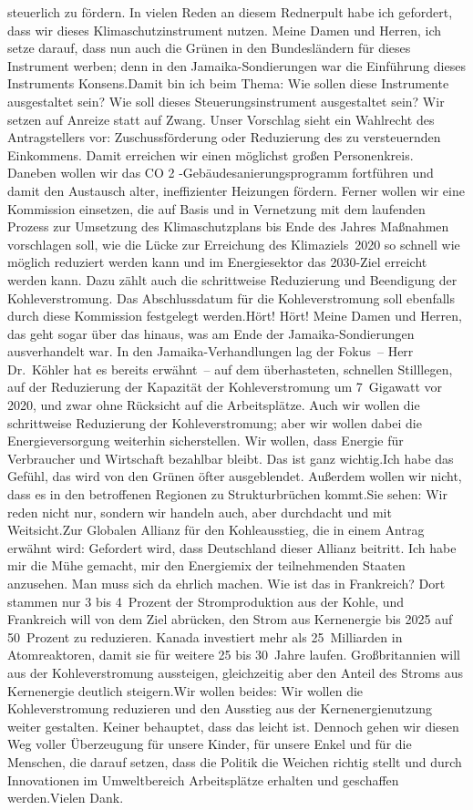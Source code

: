 \documentclass{article}
\begin{document}
steuerlich zu fördern. In vielen Reden an diesem Rednerpult habe ich gefordert, dass wir dieses Klimaschutzinstrument nutzen. Meine Damen und Herren, ich setze darauf, dass nun auch die Grünen in den Bundesländern für dieses Instrument werben; denn in den Jamaika-Sondierungen war die Einführung dieses Instruments Konsens.Damit bin ich beim Thema: Wie sollen diese Instrumente ausgestaltet sein? Wie soll dieses Steuerungsinstrument ausgestaltet sein? Wir setzen auf Anreize statt auf Zwang. Unser Vorschlag sieht ein Wahlrecht des Antragstellers vor: Zuschussförderung oder Reduzierung des zu versteuernden Einkommens. Damit erreichen wir einen möglichst großen Personenkreis. Daneben wollen wir das CO 2 -Gebäudesanierungsprogramm fortführen und damit den Austausch alter, ineffizienter Heizungen fördern. Ferner wollen wir eine Kommission einsetzen, die auf Basis und in Vernetzung mit dem laufenden Prozess zur Umsetzung des Klimaschutzplans bis Ende des Jahres Maßnahmen vorschlagen soll, wie die Lücke zur Erreichung des Klimaziels 2020 so schnell wie möglich reduziert werden kann und im Energiesektor das 2030-Ziel erreicht werden kann. Dazu zählt auch die schrittweise Reduzierung und Beendigung der Kohleverstromung. Das Abschlussdatum für die Kohleverstromung soll ebenfalls durch diese Kommission festgelegt werden.Hört! Hört! Meine Damen und Herren, das geht sogar über das hinaus, was am Ende der Jamaika-Sondierungen ausverhandelt war. In den Jamaika-Verhandlungen lag der Fokus – Herr Dr. Köhler hat es bereits erwähnt – auf dem überhasteten, schnellen Stilllegen, auf der Reduzierung der Kapazität der Kohleverstromung um 7 Gigawatt vor 2020, und zwar ohne Rücksicht auf die Arbeitsplätze. Auch wir wollen die schrittweise Reduzierung der Kohleverstromung; aber wir wollen dabei die Energieversorgung weiterhin sicherstellen. Wir wollen, dass Energie für Verbraucher und Wirtschaft bezahlbar bleibt. Das ist ganz wichtig.Ich habe das Gefühl, das wird von den Grünen öfter ausgeblendet. Außerdem wollen wir nicht, dass es in den betroffenen Regionen zu Strukturbrüchen kommt.Sie sehen: Wir reden nicht nur, sondern wir handeln auch, aber durchdacht und mit Weitsicht.Zur Globalen Allianz für den Kohleausstieg, die in einem Antrag erwähnt wird: Gefordert wird, dass Deutschland dieser Allianz beitritt. Ich habe mir die Mühe gemacht, mir den Energiemix der teilnehmenden Staaten anzusehen. Man muss sich da ehrlich machen. Wie ist das in Frankreich? Dort stammen nur 3 bis 4 Prozent der Stromproduktion aus der Kohle, und Frankreich will von dem Ziel abrücken, den Strom aus Kernenergie bis 2025 auf 50 Prozent zu reduzieren. Kanada investiert mehr als 25 Milliarden in Atomreaktoren, damit sie für weitere 25 bis 30 Jahre laufen. Großbritannien will aus der Kohleverstromung aussteigen, gleichzeitig aber den Anteil des Stroms aus Kernenergie deutlich steigern.Wir wollen beides: Wir wollen die Kohleverstromung reduzieren und den Ausstieg aus der Kernenergienutzung weiter gestalten. Keiner behauptet, dass das leicht ist. Dennoch gehen wir diesen Weg voller Überzeugung für unsere Kinder, für unsere Enkel und für die Menschen, die darauf setzen, dass die Politik die Weichen richtig stellt und durch Innovationen im Umweltbereich Arbeitsplätze erhalten und geschaffen werden.Vielen Dank.
\end{document}

